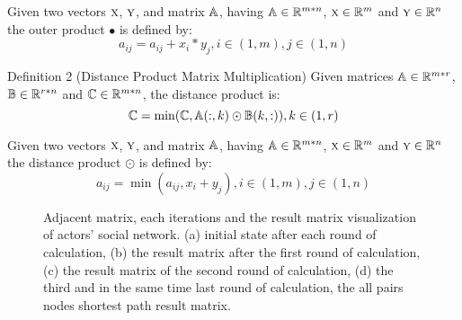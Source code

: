 \documentclass[review]{cvpr}
\begin{document}
Given two vectors \(\textsc x\), \(\textsc y\), and matrix \(\Bbb A\), having \(\Bbb A \in \Bbb R^{m*n}\), \(\textsc x \in \Bbb R^{m}\) and \(\textsc y \in \Bbb R^{n}\) the outer product \(\bullet\) is defined by:
\begin{equation}
a_{ij} = a_{ij} + x_i * y_j, i \in (1,m), j \in (1,n)
\end{equation}

Definition 2 (Distance Product Matrix Multiplication) Given matrices \(\Bbb A \in \Bbb R^{m*r}\), \(\Bbb B \in \Bbb R^{r*n}\) and \(\Bbb C \in \Bbb R^{m*n}\), the distance product is:
\begin{equation}
  \Bbb C = \min(\Bbb C, \Bbb A(:,k)\odot \Bbb B(k,:)) , k \in (1,r)
\end{equation}

Given two vectors \(\textsc x\), \(\textsc y\), and matrix \(\Bbb A\), having \(\Bbb A \in \Bbb R^{m*n}\), \(\textsc x \in \Bbb R^{m}\) and \(\textsc y \in \Bbb R^{n}\) the distance product \(\odot\) is defined by:
\begin{equation}
a_{ij} = \min(a_{ij} , x_i + y_j), i \in (1,m), j \in (1,n)
\end{equation}

\begin{figure*}
\begin{center}
\end{center}
   \caption{Adjacent matrix, each iterations and the result matrix visualization of actors' social network. (a) initial state after each round of calculation, (b) the result matrix after the first round of calculation, (c) the result matrix of the second round of calculation, (d) the third and in the same time last round of calculation, the all pairs nodes shortest path result matrix.}
\label{fig:short}
\end{figure*}
\end{document}
